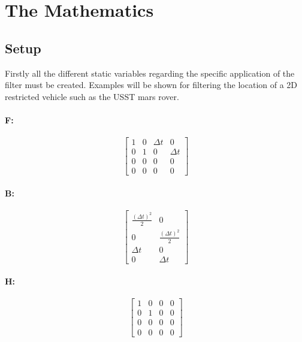 \documentclass{article}
\begin{document}
 


\section{The Mathematics}
\subsection{Setup}
Firstly all the different static variables regarding the specific application of the filter must be created. Examples will be shown for filtering the location of a 2D restricted vehicle such as the USST mars rover.\par
\paragraph{\textbf{F:}}
$$
\begin{bmatrix}
    1 & 0 & \Delta t & 0\\
    0 & 1 & 0 &  \Delta t\\
    0 & 0 & 0 & 0\\
    0 & 0 & 0 & 0
\end{bmatrix}
$$
\paragraph{\textbf{B:}}
$$
\begin{bmatrix}
    \frac{(\Delta t)^2}{2} & 0\\
    0 & \frac{(\Delta t)^2}{2}\\
    \Delta t & 0\\
    0 & \Delta t
\end{bmatrix}
$$
\paragraph{\textbf{H:}}
$$
\begin{bmatrix}
    1 & 0 & 0 & 0\\
    0 & 1 & 0 & 0\\
    0 & 0 & 0 & 0\\
    0 & 0 & 0 & 0
\end{bmatrix}
$$
\end{document}
